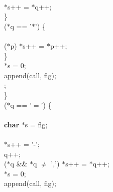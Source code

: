 \begin{flushleft}
\mbox{}\\
\hspace*{15\indentation}$\ast$s++ = $\ast$q++;\mbox{}\\
\hspace*{12\indentation}\}\mbox{}\\
\hspace*{12\indentation}{\bf if} ($\ast$q == '$\ast$') \{\mbox{}\\
\mbox{}\\
\hspace*{15\indentation}{\bf while} ($\ast$p) $\ast$s++ = $\ast$p++;\mbox{}\\
\hspace*{12\indentation}\}\mbox{}\\
\hspace*{12\indentation}$\ast$s = 0;\mbox{}\\
\hspace*{12\indentation}append(call, flg);\mbox{}\\
\hspace*{12\indentation}{\bf break};\mbox{}\\
\hspace*{9\indentation}\}\mbox{}\\
\hspace*{9\indentation}{\bf if} ($\ast$q == '$=$') \{\mbox{}\\
\mbox{}\\
\hspace*{12\indentation}{\bf register} {\bf char} $\ast$s = flg;\mbox{}\\
\mbox{}\\
\hspace*{12\indentation}$\ast$s++ = '-';\mbox{}\\
\hspace*{12\indentation}q++;\mbox{}\\
\hspace*{12\indentation}{\bf while} ($\ast$q \&\& $\ast$q $\neq$ ',') $\ast$s++ = $\ast$q++;\mbox{}\\
\hspace*{12\indentation}$\ast$s = 0;\mbox{}\\
\hspace*{12\indentation}append(call, flg);\mbox{}\\

\end{flushleft}
